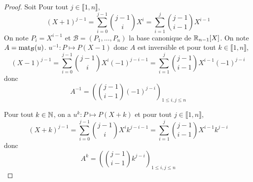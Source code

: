 \begin{proof}
    Soit 
    Pour tout $j\in\llbracket1,n\rrbracket$,
    \begin{equation}
        (X+1)^{j-1}=\sum_{i=0}^{j-1}\binom{j-1}{i}X^{i}=\sum_{i=1}^{j}\binom{j-1}{i-1}X^{i-1}
    \end{equation}
    On note $P_{i}=X^{i-1}$ et $\mathcal{B}=(P_{1},\dots,P_{n})$ la base canonique de $\mathbb{R}_{n-1}[X]$. On note $A=\operatorname{mat}_{\mathcal{B}}(u)$. $u^{-1}\colon P\mapsto P(X-1)$ donc $A$ est inversible et pour tout $k\in\llbracket1,n\rrbracket$,
    \begin{equation}
        (X-1)^{j-1}=\sum_{i=0}^{j-1}\binom{j-1}{i}X^{i}(-1)^{j-i-1}=\sum_{i=1}^{j}\binom{j-1}{i-1}X^{i-1}(-1)^{j-i}
    \end{equation}
    donc 
    \begin{equation}
        \boxed{A^{-1}=\left(\binom{j-1}{i-1}(-1)^{j-i}\right)_{1\leqslant i,j\leqslant n}}
    \end{equation}

    Pour tout $k\in\mathbb{N}$, on a $u^{k}\colon P\mapsto P(X+k)$ et pour tout $j\in\llbracket1,n\rrbracket$,
    \begin{equation}
        (X+k)^{j-1}=\sum_{i=0}^{j-1}\binom{j-1}{i}X^{i}k^{j-i-1}=\sum_{i=1}^{j}\binom{j-1}{i-1}X^{i-1}k^{j-i}
    \end{equation}
    donc 
    \begin{equation}
        \boxed{A^{k}=\left(\binom{j-1}{i-1}k^{j-i}\right)_{1\leqslant i,j\leqslant n}}
    \end{equation}
\end{proof}

